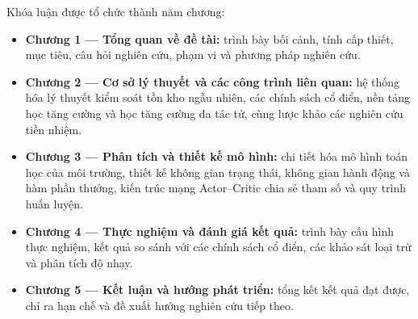 Khóa luận được tổ chức thành năm chương:

\begin{itemize}
    \item \textbf{Chương 1 --- Tổng quan về đề tài:} trình bày bối cảnh, tính
    cấp thiết, mục tiêu, câu hỏi nghiên cứu, phạm vi và phương pháp nghiên cứu.

    \item \textbf{Chương 2 --- Cơ sở lý thuyết và các công trình liên quan:}
    hệ thống hóa lý thuyết kiểm soát tồn kho ngẫu nhiên, các chính sách cổ
    điển, nền tảng học tăng cường và học tăng cường đa tác tử, cùng lược khảo
    các nghiên cứu tiền nhiệm.

    \item \textbf{Chương 3 --- Phân tích và thiết kế mô hình:} chi tiết hóa mô
    hình toán học của môi trường, thiết kế không gian trạng thái, không gian
    hành động và hàm phần thưởng, kiến trúc mạng Actor--Critic chia sẻ tham số
    và quy trình huấn luyện.

    \item \textbf{Chương 4 --- Thực nghiệm và đánh giá kết quả:} trình bày cấu
    hình thực nghiệm, kết quả so sánh với các chính sách cổ điển, các khảo sát
    loại trừ và phân tích độ nhạy.

    \item \textbf{Chương 5 --- Kết luận và hướng phát triển:} tổng kết kết quả
    đạt được, chỉ ra hạn chế và đề xuất hướng nghiên cứu tiếp theo.
\end{itemize}

